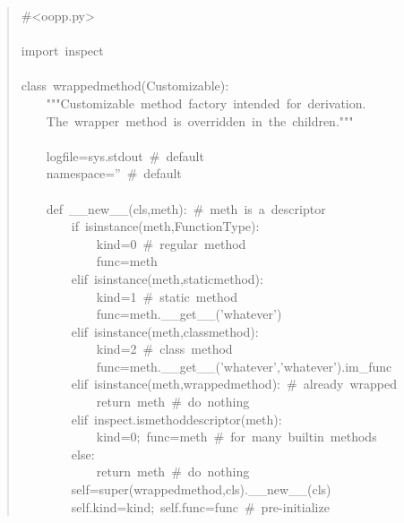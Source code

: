 \documentclass[10pt,english]{article}
\begin{document}
\begin{quote}
\begin{ttfamily}\begin{flushleft}
\mbox{{\#}<oopp.py>}\\
\mbox{}\\
\mbox{import~inspect}\\
\mbox{}\\
\mbox{class~wrappedmethod(Customizable):}\\
\mbox{~~~~"""Customizable~method~factory~intended~for~derivation.}\\
\mbox{~~~~The~wrapper~method~is~overridden~in~the~children."""}\\
\mbox{}\\
\mbox{~~~~logfile=sys.stdout~{\#}~default}\\
\mbox{~~~~namespace=''~{\#}~default}\\
\mbox{}\\
\mbox{~~~~def~{\_}{\_}new{\_}{\_}(cls,meth):~{\#}~meth~is~a~descriptor}\\
\mbox{~~~~~~~~if~isinstance(meth,FunctionType):}\\
\mbox{~~~~~~~~~~~~kind=0~{\#}~regular~method}\\
\mbox{~~~~~~~~~~~~func=meth}\\
\mbox{~~~~~~~~elif~isinstance(meth,staticmethod):}\\
\mbox{~~~~~~~~~~~~kind=1~{\#}~static~method}\\
\mbox{~~~~~~~~~~~~func=meth.{\_}{\_}get{\_}{\_}('whatever')}\\
\mbox{~~~~~~~~elif~isinstance(meth,classmethod):}\\
\mbox{~~~~~~~~~~~~kind=2~{\#}~class~method}\\
\mbox{~~~~~~~~~~~~func=meth.{\_}{\_}get{\_}{\_}('whatever','whatever').im{\_}func~}\\
\mbox{~~~~~~~~elif~isinstance(meth,wrappedmethod):~{\#}~already~wrapped}\\
\mbox{~~~~~~~~~~~~return~meth~{\#}~do~nothing}\\
\mbox{~~~~~~~~elif~inspect.ismethoddescriptor(meth):}\\
\mbox{~~~~~~~~~~~~kind=0;~func=meth~{\#}~for~many~builtin~methods~}\\
\mbox{~~~~~~~~else:}\\
\mbox{~~~~~~~~~~~~return~meth~{\#}~do~nothing}\\
\mbox{~~~~~~~~self=super(wrappedmethod,cls).{\_}{\_}new{\_}{\_}(cls)}\\
\mbox{~~~~~~~~self.kind=kind;~self.func=func~{\#}~pre-initialize}\\

\end{flushleft}
\end{ttfamily}
\end{quote}
\end{document}
